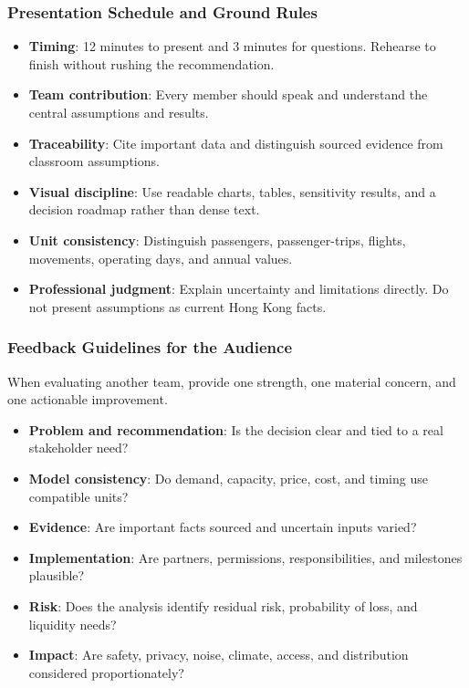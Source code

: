 \documentclass{beamer}
\begin{document}
\begin{frame}[t]
\frametitle{Presentation Schedule and Ground Rules}
\begin{itemize}
\item \textbf{Timing}: 12 minutes to present and 3 minutes for questions. Rehearse to finish without rushing the recommendation.
\item \textbf{Team contribution}: Every member should speak and understand the central assumptions and results.
\item \textbf{Traceability}: Cite important data and distinguish sourced evidence from classroom assumptions.
\item \textbf{Visual discipline}: Use readable charts, tables, sensitivity results, and a decision roadmap rather than dense text.
\item \textbf{Unit consistency}: Distinguish passengers, passenger-trips, flights, movements, operating days, and annual values.
\item \textbf{Professional judgment}: Explain uncertainty and limitations directly. Do not present assumptions as current Hong Kong facts.
\end{itemize}
\end{frame}

\begin{frame}[t]
\frametitle{Feedback Guidelines for the Audience}
When evaluating another team, provide one strength, one material concern, and one actionable improvement.
\begin{itemize}
\item \textbf{Problem and recommendation}: Is the decision clear and tied to a real stakeholder need?
\item \textbf{Model consistency}: Do demand, capacity, price, cost, and timing use compatible units?
\item \textbf{Evidence}: Are important facts sourced and uncertain inputs varied?
\item \textbf{Implementation}: Are partners, permissions, responsibilities, and milestones plausible?
\item \textbf{Risk}: Does the analysis identify residual risk, probability of loss, and liquidity needs?
\item \textbf{Impact}: Are safety, privacy, noise, climate, access, and distribution considered proportionately?
\end{itemize}
\end{frame}
\end{document}
